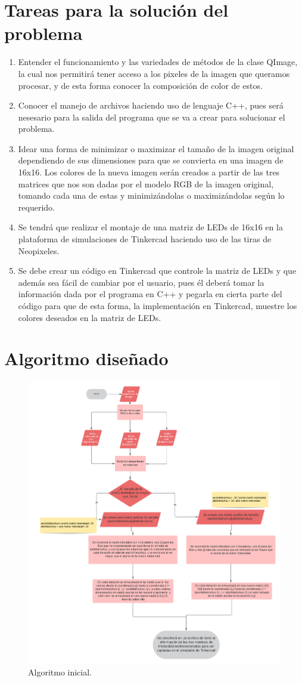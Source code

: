 \documentclass{article}
\begin{document}
\section{Tareas para la solución del problema} \label{tareas}
\begin{enumerate}
\item Entender el funcionamiento y las variedades de métodos de la clase QImage, la cual nos permitirá tener acceso a los pixeles de la imagen que queramos procesar, y de esta forma conocer la composición de color de estos.
\item Conocer el manejo de archivos haciendo uso de lenguaje C++, pues será nesesario para la salida del programa que se va a crear para solucionar el problema.
\item Idear una forma de minimizar o maximizar el tamaño de la imagen original dependiendo de sus dimensiones para que se convierta en una imagen de 16x16. Los colores de la nueva imagen serán creados a partir de las tres matrices que nos son dadas por el modelo RGB de la imagen original, tomando cada una de estas y minimizándolas o maximizándolas según lo requerido.
\item Se tendrá que realizar el montaje de una matriz de LEDs de 16x16 en la plataforma de simulaciones de Tinkercad haciendo uso de las tiras de Neopixeles.
\item Se debe crear un código en Tinkercad que controle la matriz de LEDs y que además sea fácil de cambiar por el usuario, pues él deberá tomar la información dada por el programa en C++ y pegarla en cierta parte del código para que de esta forma, la implementación en Tinkercad, muestre los colores deseados en la matriz de LEDs.


\end{enumerate}

\newpage
\section{Algoritmo diseñado} \label{algorimo}
\begin{figure}[h]
\includegraphics[width=15cm]{algoritmo.png}
\centering
\caption{Algoritmo inicial.}
\label{fig:algoritmo}
\end{figure}
\end{document}
